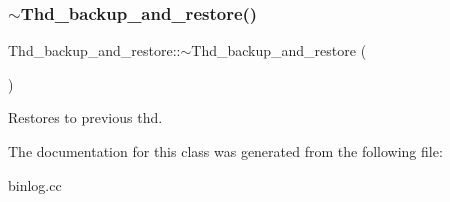 \subsubsection{\texorpdfstring{$\sim$\+Thd\+\_\+backup\+\_\+and\+\_\+restore()}{~Thd\_backup\_and\_restore()}}
{\footnotesize\ttfamily Thd\+\_\+backup\+\_\+and\+\_\+restore\+::$\sim$\+Thd\+\_\+backup\+\_\+and\+\_\+restore (\begin{DoxyParamCaption}{ }\end{DoxyParamCaption})\hspace{0.3cm}{\ttfamily [inline]}}

Restores to previous thd. 

The documentation for this class was generated from the following file\+:\begin{DoxyCompactItemize}
\item 
binlog.\+cc\end{DoxyCompactItemize}
